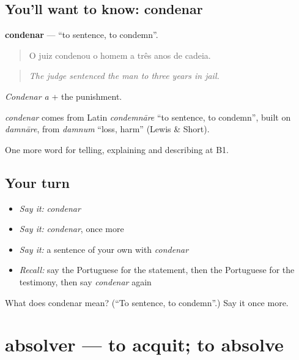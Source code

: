 \subsection*{You'll want to know: condenar}
\textbf{condenar} — \textquotedblleft{}to sentence, to condemn\textquotedblright{}.

\begin{quote}
O juiz condenou o homem a três anos de cadeia.
\end{quote}

\begin{quote}
\emph{The judge sentenced the man to three years in jail.}
\end{quote}

\emph{Condenar a} + the punishment.

\begin{cousinweb}
\emph{condenar} comes from Latin \emph{condemnāre} \textquotedblleft{}to sentence, to condemn\textquotedblright{}, built on \emph{damnāre}, from \emph{damnum} \textquotedblleft{}loss, harm\textquotedblright{} (Lewis \& Short).
\end{cousinweb}

\begin{grammarlens}[title={What you've built}]
One more word for telling, explaining and describing at B1.
\end{grammarlens}

\subsection*{Your turn}
\begin{itemize}
\raggedright
  \item \emph{Say it:} \emph{condenar}
  \item \emph{Say it:} \emph{condenar}, once more
  \item \emph{Say it:} a sentence of your own with \emph{condenar}
  \item \emph{Recall:} say the Portuguese for the statement, then the Portuguese for the testimony, then say \emph{condenar} again
\end{itemize}

\begin{tcolorbox}[breakable,colback=teal!4,colframe=teal!35!black,title={Before you move on}]
What does condenar mean? (\textquotedblleft{}To sentence, to condemn\textquotedblright{}.) Say it once more.
\end{tcolorbox}
\section[absolver]{absolver — to acquit; to absolve}

